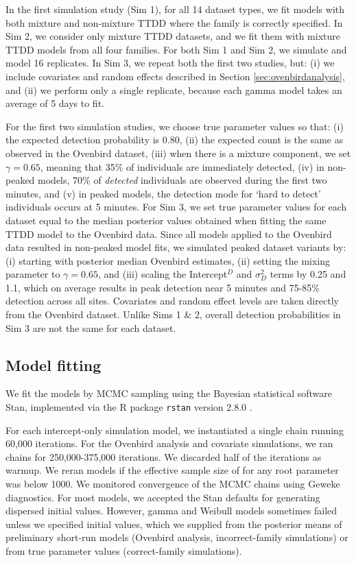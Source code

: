 \documentclass[useAMS,usenatbib,referee,12pt]{article}
\begin{document}
In the first simulation study (Sim 1), for all 14 dataset types, we fit models with both mixture and non-mixture TTDD where the family is correctly specified.  In Sim 2, we consider only mixture TTDD datasets, and we fit them with mixture TTDD models from all four families.  For both Sim 1 and Sim 2, we simulate and model 16 replicates.  In Sim 3, we repeat both the first two studies, but: (i) we include covariates and random effects described in Section \ref{sec:ovenbirdanalysis}, and (ii) we perform only a single replicate, because each gamma model takes an average of 5 days to fit.

For the first two simulation studies, we choose true parameter values so that: (i) the expected detection probability is 0.80, (ii) the expected count is the same as observed in the Ovenbird dataset, (iii) when there is a mixture component, we set $\gamma = 0.65$, meaning that 35\% of individuals are immediately detected, (iv) in non-peaked models, 70\% of \textit{detected} individuals are observed during the first two minutes, and (v) in peaked models, the detection mode for `hard to detect' individuals occurs at 5 minutes.  For Sim 3, we set true parameter values for each dataset equal to the median posterior values obtained when fitting the same TTDD model to the Ovenbird data.  Since all models applied to the Ovenbird data resulted in non-peaked model fits, we simulated peaked dataset variants by: (i) starting with posterior median Ovenbird estimates, (ii) setting the mixing parameter to $\gamma = 0.65$, and (iii) scaling the Intercept$^D$ and $\sigma_D^2$ terms by 0.25 and 1.1, which on average results in peak detection near 5 minutes and 75-85\% detection across all sites.  Covariates and random effect levels are taken directly from the Ovenbird dataset.  Unlike Sims 1 \& 2, overall detection probabilities in Sim 3 are not the same for each dataset.




\subsection{Model fitting}

We fit the models by MCMC sampling using the Bayesian statistical software Stan, implemented via the R package \texttt{rstan} version 2.8.0 \citep{Rstan2015}.  

For each intercept-only simulation model, we instantiated a single chain running 60,000 iterations.  For the Ovenbird analysis and covariate simulations, we ran chains for 250,000-375,000 iterations.  We discarded half of the iterations as warmup.  We reran models if the effective sample size of for any root parameter was below 1000.  We monitored convergence of the MCMC chains using Geweke diagnostics.  For most models, we accepted the Stan defaults for generating dispersed initial values.  However, gamma and Weibull models sometimes failed unless we specified initial values, which we supplied from the posterior means of preliminary short-run models (Ovenbird analysis, incorrect-family simulations) or from true parameter values (correct-family simulations).
\end{document}
